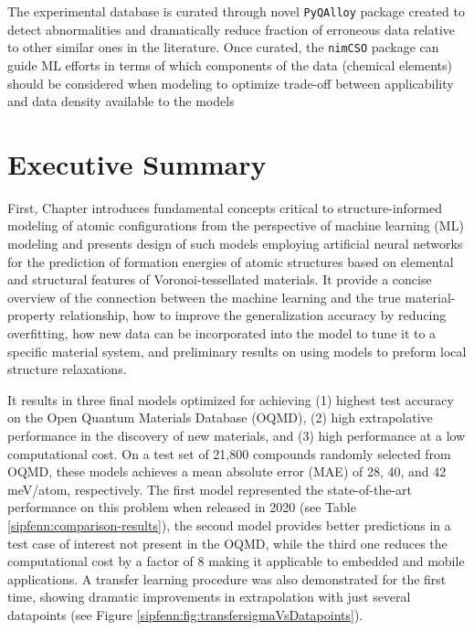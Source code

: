 The experimental database is curated through novel \texttt{PyQAlloy} package created to detect abnormalities and dramatically reduce fraction of erroneous data relative to other similar ones in the literature. Once curated, the \texttt{nimCSO} package can guide ML efforts in terms of which components of the data (chemical elements) should be considered when modeling to optimize trade-off between applicability and data density available to the models




\section{Executive Summary} \label{intro:sec:summary}

First, Chapter  introduces fundamental concepts critical to structure-informed modeling of atomic configurations from the perspective of machine learning (ML) modeling and presents design of such models employing artificial neural networks for the prediction of formation energies of atomic structures based on elemental and structural features of Voronoi-tessellated materials. It provide a concise overview of the connection between the machine learning and the true material-property relationship, how to improve the generalization accuracy by reducing overfitting, how new data can be incorporated into the model to tune it to a specific material system, and preliminary results on using models to preform local structure relaxations.

It results in three final models optimized for achieving (1) highest test accuracy on the Open Quantum Materials Database (OQMD), (2) high extrapolative performance in the discovery of new materials, and (3) high performance at a low computational cost. On a test set of 21,800 compounds randomly selected from OQMD, these models achieves a mean absolute error (MAE) of 28, 40, and 42 meV/atom, respectively. The first model represented the state-of-the-art performance on this problem when released in 2020 \cite{Krajewski2020SIPFENNModels} (see Table \ref{sipfenn:comparison-results}), the second model provides better predictions in a test case of interest not present in the OQMD, while the third one reduces the computational cost by a factor of 8 making it applicable to embedded and mobile applications. A transfer learning procedure was also demonstrated for the first time, showing dramatic improvements in extrapolation with just several datapoints (see Figure \ref{sipfenn:fig:transfersigmaVsDatapoints}).

